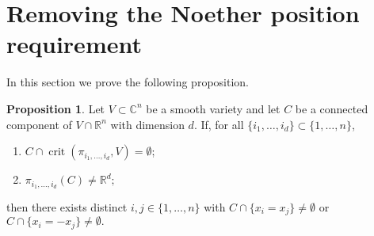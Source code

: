 \documentclass[10pt]{article}
\theoremstyle{definition}
\newtheorem{proposition}{Proposition}
\newcommand{\C}{\mathbb{C}}
\newcommand{\R}{\mathbb{R}}
\DeclareMathOperator{\crit}{crit}
\begin{document}
\section{Removing the Noether position requirement}
In this section we prove the following proposition. 
%
\begin{proposition}\label{prop:main}
Let $V \subset \C^n$ be a smooth variety and let $C$ be a connected component of $V \cap \R^n$ with dimension $d$. If, for all $\{i_1,\hdots,i_d\} \subset \{1,\dots,n\}$, 
\begin{enumerate}
    \item $C \cap \crit(\pi_{i_1,\hdots,i_d},V) = \emptyset$;
    \item $\pi_{i_1,\hdots,i_d}(C) \not = \R^d;$
\end{enumerate}
then there exists distinct $i,j \in\{1,\hdots,n\}$ with $C \cap \{ x_i= x_j\} \not = \emptyset$ or 
$C \cap \{ x_i= -x_j\} \not = \emptyset.$
\end{proposition}
%





\end{document}
